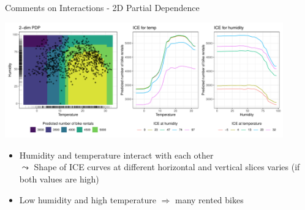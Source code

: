 \documentclass[11pt,compress,t,notes=noshow, aspectratio=169, xcolor=table]{beamer}
\begin{document}
\begin{frame}{Comments on Interactions - 2D Partial Dependence}

\begin{center}
\includegraphics[width=0.9\textwidth]{figure/pdp2d_bike}
\end{center}

\begin{itemize}
 \item Humidity and temperature interact with each other\\
 $\leadsto$ Shape of ICE curves at different horizontal and vertical slices varies (if both values are high)
 \item Low humidity and high temperature $\Rightarrow$ many rented bikes
\end{itemize}


%

\end{frame}




\endlecture
\end{document}
